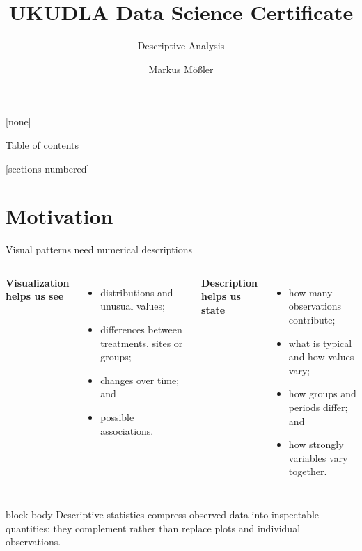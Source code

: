 \documentclass[10pt,aspectratio=169]{beamer}
\title{UKUDLA Data Science Certificate}
\subtitle{Descriptive Analysis}
\author{Markus Mößler}
\institute{University of Hohenheim}
\begin{document}
\maketitle

{
[none]

\begin{frame}[noframenumbering]{Table of contents}

  \small
  [sections numbered]
  \tableofcontents[hideallsubsections]

\end{frame}
}



\section{Motivation}


\begin{frame}{Visual patterns need numerical descriptions}

\small

\begin{columns}[T]


\textbf{Visualization helps us see}

\begin{itemize}
  \item distributions and unusual values;
  \item differences between treatments, sites or groups;
  \item changes over time; and
  \item possible associations.
\end{itemize}


\textbf{Description helps us state}

\begin{itemize}
  \item how many observations contribute;
  \item what is typical and how values vary;
  \item how groups and periods differ; and
  \item how strongly variables vary together.
\end{itemize}

\end{columns}

\vspace{0.35cm}

\begin{beamercolorbox}[rounded=true,sep=8pt]{block body}
Descriptive statistics compress observed data into inspectable quantities; they complement rather than replace plots and individual observations.
\end{beamercolorbox}

\end{frame}
\end{document}
